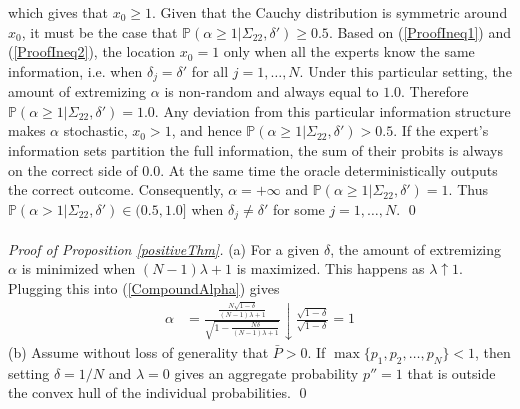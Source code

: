 \documentclass[11pt]{article}
\renewcommand{\P}{\mathbb{P}}
\theoremstyle{definition}
\theoremstyle{definition}
\def\P{{\mathbb P}}
\begin{document}
which gives that $x_0 \geq 1$. Given that the Cauchy distribution is symmetric around $x_0$, it must be the case that $\P(\alpha \geq 1 | \Sigma_{22}, \delta') \geq 0.5$. Based on (\ref{ProofIneq1}) and (\ref{ProofIneq2}), the location $x_0 = 1$ only when all the experts know the same information, i.e. when $\delta_j = \delta'$ for all $j = 1, \dots, N$. Under this particular setting, the amount of extremizing $\alpha$ is non-random and always equal to $1.0$. Therefore $\P(\alpha \geq 1 | \Sigma_{22}, \delta') = 1.0$.  Any deviation from this particular information structure makes $\alpha$ stochastic, $x_0 > 1$, and hence $\P(\alpha \geq 1 | \Sigma_{22}, \delta') > 0.5$. If the expert's information sets partition the full information, the sum of their probits is always on the correct side of $0.0$. At the same time the oracle deterministically outputs the correct outcome. Consequently, $\alpha = +\infty$ and $\P(\alpha \geq 1 | \Sigma_{22}, \delta') = 1$. Thus $\P(\alpha > 1 | \Sigma_{22}, \delta') \in (0.5, 1.0]$ when $\delta_j \neq \delta'$ for some $j = 1, \dots, N$. \qed
\\
\\
\noindent
\textit{Proof of Proposition \ref{positiveThm}.} (a) For a given $\delta$, the amount of extremizing $\alpha$ is minimized when $(N-1)\lambda +1$ is maximized. This happens as $\lambda \uparrow 1$. Plugging this into (\ref{CompoundAlpha}) gives
\begin{align*}
\alpha &= \frac{\frac{N\sqrt{1-\delta}}{(N-1)\lambda +1}}{\sqrt{1- \frac{N\delta}{(N-1)\lambda +1} }}  \downarrow \frac{\sqrt{1-\delta}}{\sqrt{1-\delta }} = 1
\end{align*}
(b) Assume without loss of generality that $\bar{P} > 0$. If $\max\{p_1, p_2, \dots, p_N \} < 1$, then  setting $\delta = 1/N$ and $\lambda = 0$ gives an aggregate probability $p'' = 1$ that is outside the convex hull of the individual probabilities.
\qed
\end{document}
